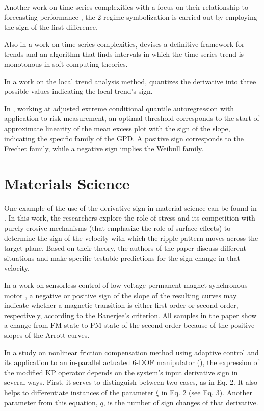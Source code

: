 \documentclass[11pt]{book}
\begin{document}
Another work on time series complexities with a focus on their relationship to forecasting performance \cite{ponce2020time}, the 2-regime symbolization is carried out
by employing the sign of the first difference.

Also in a work on time series complexities, \cite{novak2016linguistic} devises a definitive framework for trends
and an algorithm that finds intervals in which the time series trend
is monotonous in soft computing theories.

In a work on the local trend analysis method, \cite{tang2015evaluation} quantizes the derivative into three possible values indicating the local trend's
sign.

In \cite{kithinji2021adjusted}, working at adjusted extreme conditional quantile autoregression with application to risk measurement, an optimal threshold corresponds
to the start of approximate linearity of the mean excess plot with
the sign of the slope, indicating the specific family of the GPD.
A positive sign corresponds to the Frechet family, while a negative
sign implies the Weibull family.


\section{Materials Science}

One example of the use of the derivative sign in material science can be found in \cite{moreno2015stress}. In this work, the researchers explore the role of stress and its competition with purely erosive mechanisms (that emphasize the role of surface effects) to determine the sign of the velocity with which the ripple
pattern moves across the target plane. Based on their theory, the authors of the paper
discuss different situations and make specific testable predictions
for the sign change in that velocity.

In a work on sensorless control of low voltage permanent magnet
synchronous motor \cite{ccetin2017effect}, a negative or positive sign
of the slope of the resulting curves may
indicate whether a magnetic transition is either first order or second
order, respectively, according to the Banerjee's criterion. All samples in the paper show a change from FM state to PM
state of the second order because of the positive slopes of the Arrott
curves.

In a study on nonlinear friction compensation
method using adaptive control and its application to an in-parallel actuated
6-DOF manipulator (\cite{zhou2017model}), the expression of the modified KP operator
depends on the system's input derivative sign in several ways. First,
it serves to distinguish between two cases, as in Eq. 2. It also helps
to differentiate instances of the parameter $\xi$ in Eq. 2 (see Eq.
3). Another parameter from this equation, $q$, is the number of sign
changes of that derivative.
\end{document}
